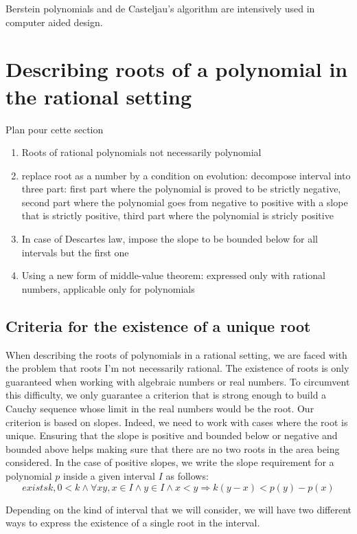 \documentclass{article}
\begin{document}
Berstein polynomials and de Casteljau's algorithm are intensively used
in computer aided design.

\section{Describing roots of a polynomial in the rational setting}
Plan pour cette section
\begin{enumerate}
\item Roots of rational polynomials not necessarily polynomial
\item replace root as a number by a condition on evolution: decompose interval into three part: first part where the polynomial is proved to be strictly negative, second part where the polynomial goes from negative to positive with a slope that is strictly positive, third part where the polynomial is stricly positive
\item In case of Descartes law, impose the slope to be bounded below for all intervals but the first one
\item Using a new form of middle-value theorem: expressed only with rational numbers, applicable only for polynomials
\end{enumerate}

\subsection{Criteria for the existence of a unique root}
When describing the roots of polynomials in a rational setting, we are
faced with the problem that roots I'm not necessarily rational. The
existence of roots is only guaranteed when working with algebraic
numbers or real numbers. To circumvent this difficulty, we only
guarantee a criterion that is strong enough to build a Cauchy sequence
whose limit in the real numbers would be the root. Our criterion is
based on slopes. Indeed, we need to work with cases where the root is
unique. Ensuring that the slope is positive and bounded below or
negative and bounded above helps making sure that there are no two
roots in the area being considered. In the case of positive slopes, we
write the slope requirement for a polynomial \(p\) inside a given interval
\(I\) as follows:
\[exists k, 0 < k \wedge \forall x y, x \in I \wedge y \in I 
\wedge x < y \Rightarrow k(y - x) < p(y) - p (x) \]

Depending on the kind of interval that we will consider, we will have
two different ways to express the existence of a single root in the
interval.
\end{document}

